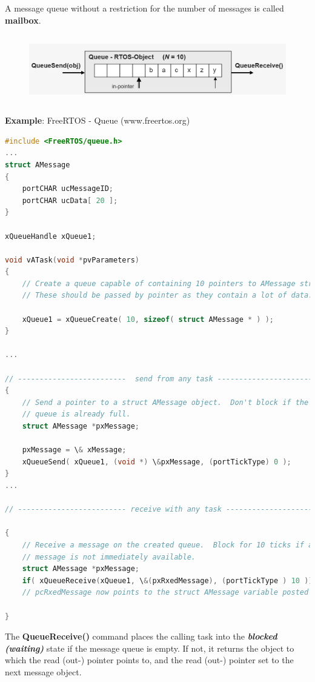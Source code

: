 A message queue without a restriction for the number of messages is called \textbf{mailbox}.

 	\begin{figure}[h]
    \centering
    \includegraphics[width=14cm, height=3cm]{Images/image115.png}
    \label{fig:Fig }
    \end{figure}
    
\textbf{Example}: FreeRTOS - Queue (www.freertos.org)

\begin{lstlisting}[style=mystyle, language=c]
#include <FreeRTOS/queue.h>
...
struct AMessage
{
	portCHAR ucMessageID;
	portCHAR ucData[ 20 ];
}

xQueueHandle xQueue1;

void vATask(void *pvParameters)
{
	// Create a queue capable of containing 10 pointers to AMessage structures.
	// These should be passed by pointer as they contain a lot of data.

	xQueue1 = xQueueCreate( 10, sizeof( struct AMessage * ) );
}

...

// -------------------------  send from any task ----------------------------}
{
 	// Send a pointer to a struct AMessage object.  Don't block if the
  	// queue is already full.
 	struct AMessage *pxMessage;

 	pxMessage = \& xMessage;
	xQueueSend( xQueue1, (void *) \&pxMessage, (portTickType) 0 );
}
...

// ------------------------- receive with any task --------------------------}

{  
	// Receive a message on the created queue.  Block for 10 ticks if a
	// message is not immediately available.
	struct AMessage *pxMessage;
	if( xQueueReceive(xQueue1, \&(pxRxedMessage), (portTickType ) 10 ))
	// pcRxedMessage now points to the struct AMessage variable posted

}
\end{lstlisting}

The \textbf{QueueReceive()} command places the calling task into the \textbf{\textit{blocked (waiting)}} state if the message queue is empty. If not, it returns the object to which the read (out-) pointer points to, and the read (out-) pointer set to the next message object.\\

